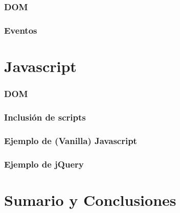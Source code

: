 \documentclass[a4paper,slidestop,xcolor=pst,blue]{beamer}
\begin{document}
\begin{frame}[c]
    \frametitle{DOM}
\end{frame}

\begin{frame}[c]
    \frametitle{Eventos}
\end{frame}

\section{Javascript}

\begin{frame}[c]
    \frametitle{DOM}
\end{frame}

\begin{frame}[c]
    \frametitle{Inclusión de scripts}
\end{frame}

\begin{frame}[c]
    \frametitle{Ejemplo de (Vanilla) Javascript}
\end{frame}

\begin{frame}[c]
    \frametitle{Ejemplo de jQuery}
\end{frame}



\section{Sumario y Conclusiones}
\end{document}
